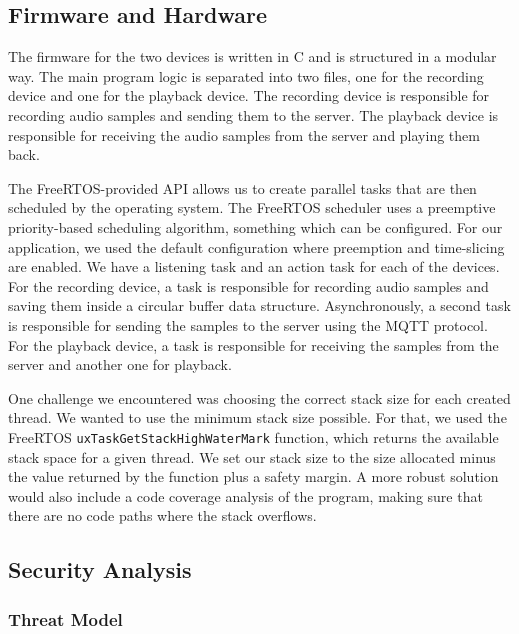 \documentclass[conference]{IEEEtran}
\begin{document}
\subsection{Firmware and Hardware}

The firmware for the two devices is written in C and is structured in a modular way.
The main program logic is separated into two files, one for the recording device and one for the playback device.
The recording device is responsible for recording audio samples and sending them to the server.
The playback device is responsible for receiving the audio samples from the server and playing them back.

The FreeRTOS-provided API allows us to create parallel tasks that are then scheduled by the operating system.
The FreeRTOS scheduler uses a preemptive priority-based scheduling algorithm\cite{FreeRTOS_Scheduling}, something which can be configured.
For our application, we used the default configuration where preemption and time-slicing are enabled.
We have a listening task and an action task for each of the devices.
For the recording device, a task is responsible for recording audio samples and saving them 
inside a circular buffer data structure. Asynchronously, a second task is responsible for
sending the samples to the server using the MQTT protocol.
For the playback device, a task is responsible for receiving the samples from the server
and another one for playback.

One challenge we encountered was choosing the correct stack size for each created thread.
We wanted to use the minimum stack size possible.
For that, we used the FreeRTOS \texttt{uxTaskGetStackHighWaterMark} function, which returns
the available stack space for a given thread.
We set our stack size to the size allocated minus the value returned by the function plus a safety margin.
A more robust solution would also include a code coverage analysis\cite{CodeCoverage} of the program,
making sure that there are no code paths where the stack overflows.

\subsection{Security Analysis}
\label{subsec:security_analysis}


\subsubsection{Threat Model}
\end{document}
